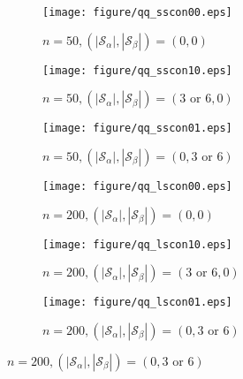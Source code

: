 \documentclass[a4paper]{article}
\begin{document}
\begin{figure}[!ht]
     \centering
     \begin{subfigure}{0.32\textwidth}
         \centering
         \caption*{$n=50, (|\mathcal{S}_\alpha|,|\mathcal{S}_\beta|)=(0,0)$}
         \texttt{[image: figure/qq\_sscon00.eps]}
     \end{subfigure}
     \hfill
     \begin{subfigure}{0.32\textwidth}
         \centering
         \caption*{$n=50, (|\mathcal{S}_\alpha|,|\mathcal{S}_\beta|)=(3 \text{ or } 6,0)$}
         \texttt{[image: figure/qq\_sscon10.eps]}
     \end{subfigure}
     \hfill
     \begin{subfigure}{0.32\textwidth}
         \centering
         \caption*{$n=50, (|\mathcal{S}_\alpha|,|\mathcal{S}_\beta|)=(0, 3 \text{ or } 6)$}
         \texttt{[image: figure/qq\_sscon01.eps]}
     \end{subfigure}
     
     \begin{subfigure}{0.32\textwidth}
         \centering
         \caption*{$n=200, (|\mathcal{S}_\alpha|,|\mathcal{S}_\beta|)=(0,0)$}
         \texttt{[image: figure/qq\_lscon00.eps]}
     \end{subfigure}
     \hfill
     \begin{subfigure}{0.32\textwidth}
         \centering
         \caption*{$n=200, (|\mathcal{S}_\alpha|,|\mathcal{S}_\beta|)=(3 \text{ or } 6,0)$}
         \texttt{[image: figure/qq\_lscon10.eps]}
     \end{subfigure}
     \hfill
     \begin{subfigure}{0.32\textwidth}
         \centering
         \caption*{$n=200, (|\mathcal{S}_\alpha|,|\mathcal{S}_\beta|)=(0, 3 \text{ or } 6)$}
         \texttt{[image: figure/qq\_lscon01.eps]}
     \end{subfigure}
\end{figure}
\thispagestyle{empty}
\newpage
\end{document}
